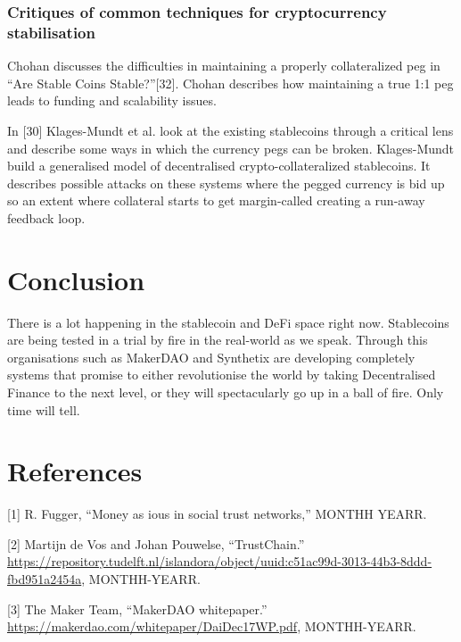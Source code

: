 \documentclass[english,]{IEEEtran}
\begin{document}
\subsubsection{Critiques of common techniques for cryptocurrency
stabilisation}\label{critiques-of-common-techniques-for-cryptocurrency-stabilisation}

Chohan discusses the difficulties in maintaining a properly
collateralized peg in ``Are Stable Coins Stable?''{[}32{]}. Chohan
describes how maintaining a true 1:1 peg leads to funding and
scalability issues.

In {[}30{]} Klages-Mundt et al. look at the existing stablecoins through
a critical lens and describe some ways in which the currency pegs can be
broken. Klages-Mundt build a generalised model of decentralised
crypto-collateralized stablecoins. It describes possible attacks on
these systems where the pegged currency is bid up so an extent where
collateral starts to get margin-called creating a run-away feedback
loop.

\section{Conclusion}\label{conclusion}

There is a lot happening in the stablecoin and DeFi space right now.
Stablecoins are being tested in a trial by fire in the real-world as we
speak. Through this organisations such as MakerDAO and Synthetix are
developing completely systems that promise to either revolutionise the
world by taking Decentralised Finance to the next level, or they will
spectacularly go up in a ball of fire. Only time will tell.

\section*{References}\label{references}

\hypertarget{refs}{}
\hypertarget{ref-Money_as_IOUs_in_Social_Trust_Networks}{}
{[}1{]} R. Fugger, ``Money as ious in social trust networks,'' MONTHH
YEARR.

\hypertarget{ref-TrustChain}{}
{[}2{]} Martijn de Vos and Johan Pouwelse, ``TrustChain.''
\url{https://repository.tudelft.nl/islandora/object/uuid:c51ac99d-3013-44b3-8ddd-fbd951a2454a},
MONTHH-YEARR.

\hypertarget{ref-MakerDAO:whitepaper}{}
{[}3{]} The Maker Team, ``MakerDAO whitepaper.''
\url{https://makerdao.com/whitepaper/DaiDec17WP.pdf}, MONTHH-YEARR.
\end{document}

